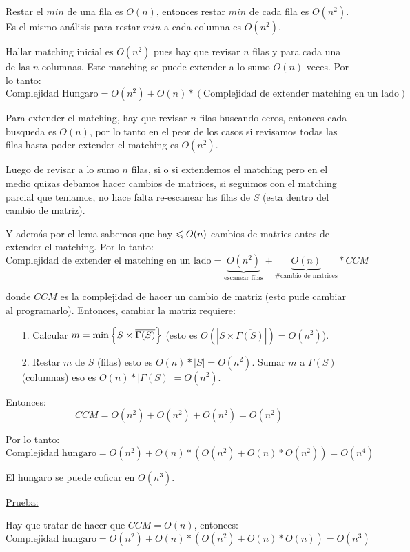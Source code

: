 \documentclass[12pt,a4paper]{article}
\begin{document}
Restar el $min$ de una fila es $O(n)$, entonces restar $min$ de 
cada fila es $O(n^2)$. Es el mismo análisis para restar $min$ a cada columna 
es $O(n^{2})$.
\medskip

Hallar matching inicial es $O(n^2)$ pues hay que revisar $n$ filas y para cada 
una de las $n$ columnas. Este matching se puede extender a lo sumo 
$O(n)$ veces. Por lo tanto:
$$\text{Complejidad Hungaro} = O(n^2) + O(n)*(\text{Complejidad de extender matching en un lado})$$

Para extender el matching, hay que revisar $n$ filas buscando ceros, entonces cada 
busqueda es $O(n)$, por lo tanto en el peor de los casos si revisamos todas
las filas hasta poder extender el matching es $O(n^{2})$.
\medskip

Luego de revisar a lo sumo $n$ filas, si o si extendemos el matching pero 
en el medio quizas debamos hacer cambios de matrices, si seguimos con el matching 
parcial que teniamos, no hace falta re-escanear las filas de $S$ (esta dentro del 
cambio de matriz).
\medskip

Y además por el lema sabemos que hay $\leqslant O(n)$ cambios de matries antes de extender 
el matching. Por lo tanto:
$$\text{Complejidad de extender el matching en un lado} = \underbrace{O(n^{2})}_{\text{escanear filas}} + \underbrace{O(n)}_{\text{\# cambio de matrices}} * CCM$$

donde $CCM$ es la complejidad de hacer un cambio de matriz (esto pude cambiar al programarlo).
Entonces, cambiar la matriz requiere:
\medskip

\begin{itemize}
    \item [1.] Calcular $m = \min \left\lbrace S \times \overline{\Gamma(S)} \right\rbrace$ (esto es $O(|S \times \overline{\Gamma(S)}|)=O(n^2)$).
    \item [2.] Restar $m$ de $S$ (filas) esto es $O(n)*|S| = O(n^2)$. Sumar $m$ a $\Gamma(S)$ (columnas) 
        eso es $O(n)*|\Gamma(S)| = O(n^2)$.
\end{itemize}
Entonces:
$$CCM = O(n^2) + O(n^2) + O(n^2) = O(n^2)$$

Por lo tanto:
$$\text{Complejidad hungaro} = O(n^{2}) + O(n)*(O(n^{2}) + O(n)*O(n^{2})) = O(n^{4})$$

\begin{teorema} El hungaro se puede coficar en $O(n^3)$.
\end{teorema}
\underline{Prueba:}
\medskip

Hay que tratar de hacer que $CCM = O(n)$, entonces:
$$\text{Complejidad hungaro} = O(n^{2}) + O(n)*(O(n^{2}) + O(n)*O(n)) = O(n^{3})$$
\end{document}
